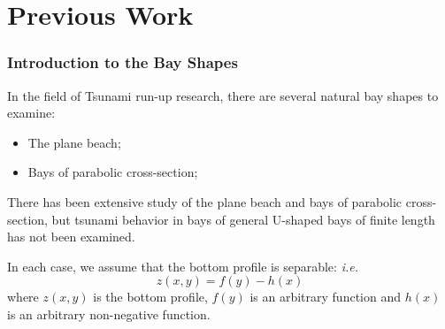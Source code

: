 

\section{Previous Work}
	\begin{frame}
		\frametitle{Introduction to the Bay Shapes}
		In the field of Tsunami run-up research, there are several natural bay shapes to examine:
		\begin{itemize}
			\item The plane beach;
			\item Bays of parabolic cross-section;
		\end{itemize}
		There has been extensive study of the plane beach and bays of parabolic cross-section, but tsunami behavior in bays of general U-shaped bays of finite length has not been examined.
		
		In each case, we assume that the bottom profile is separable: \emph{i.e.}
		\[   z(x,y) = f(y) - h(x)  \]
		where $z(x,y)$ is the bottom profile, $f(y)$ is an arbitrary function and $h(x)$ is an arbitrary non-negative function.
	\end{frame}


